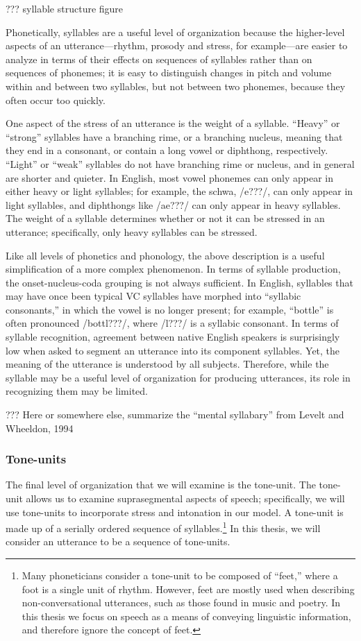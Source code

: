 ??? syllable structure figure

Phonetically, syllables are a useful
level of organization because
the higher-level aspects
of an utterance---rhythm, prosody and stress,
for example---are easier to analyze
in terms of their effects on
sequences of syllables rather than
on sequences of phonemes;
it is easy to distinguish
changes in pitch and volume
within and between two syllables,
but not between two phonemes,
because they often occur too quickly.

One aspect of the stress of an utterance
is the weight of a syllable.
``Heavy'' or ``strong'' syllables
have a branching rime,
or a branching nucleus,
meaning that they
end in a consonant,
or contain a long vowel or diphthong,
respectively.
``Light'' or ``weak'' syllables
do not have branching rime or nucleus,
and in general are shorter
and quieter.
In English, most vowel phonemes
can only appear in either
heavy or light syllables;
for example, the schwa, /e???/,
can only appear in light syllables,
and diphthongs like /ae???/
can only appear in heavy syllables.
The weight of a syllable determines
whether or not it can be stressed
in an utterance;
specifically, only heavy syllables
can be stressed.

Like all levels of phonetics and phonology,
the above description is a useful simplification
of a more complex phenomenon.
In terms of syllable production,
the onset-nucleus-coda grouping
is not always sufficient.
In English, syllables that may have once
been typical VC syllables have morphed
into ``syllabic consonants,'' in which
the vowel is no longer present;
for example, ``bottle'' is often
pronounced /bottl???/,
where /l???/ is a syllabic consonant.
In terms of syllable recognition,
agreement between native English speakers
is surprisingly low when
asked to segment an utterance
into its component syllables.
Yet, the meaning of the utterance
is understood by all subjects.
Therefore, while the syllable
may be a useful level of organization
for producing utterances,
its role in recognizing them
may be limited.

??? Here or somewhere else, summarize
the ``mental syllabary'' from Levelt and Wheeldon, 1994

\subsubsection{Tone-units}

The final level of organization
that we will examine is the tone-unit.
The tone-unit allows us to examine
suprasegmental aspects of speech;
specifically, we will use tone-units
to incorporate stress and intonation
in our model.
A tone-unit is made up of a serially ordered
sequence of syllables.\footnote{Many
  phoneticians consider a tone-unit to be
  composed of ``feet,'' where a foot is
  a single unit of rhythm.
  However, feet are mostly used when describing
  non-conversational utterances,
  such as those found in music and poetry.
  In this thesis we focus on speech
  as a means of conveying linguistic information,
  and therefore ignore the concept of feet.}
In this thesis, we will consider
an utterance to be a sequence of tone-units.

